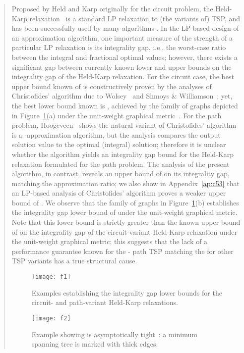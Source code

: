 \documentclass[11pt,letterpaper]{article}
\newcommand{\st}{\mbox{-} }
\begin{document}
\begin{quote}
Proposed by Held and Karp \cite{HK} originally for the circuit problem, the Held-Karp relaxation~\cite{HK} is a standard LP relaxation to (the variants of) TSP, and has been successfully used by many algorithms \cite{BGSW, G:pc, AGMOS, AKS, OSS, MS, M}. In the LP-based design of an approximation algorithm, one important measure of the strength of a particular LP relaxation is its integrality gap, i.e., the worst-case ratio between the integral and fractional optimal values; however, there exists a significant gap between currently known lower and upper bounds on the integrality gap of the Held-Karp relaxation. For the circuit case, the best upper bound known of  is constructively proven by the analyses of Christofides' algorithm due to Wolsey~\cite{W} and Shmoys \& Williamson~\cite{SW}; yet, the best lower bound known is , achieved by the family of graphs depicted in Figure~\ref{f:ig}(a) under the unit-weight graphical metric~\cite{G:ineq}. For the path problem, Hoogeveen~\cite{H} shows the natural variant of Christofides' algorithm is a -approximation algorithm, but the analysis compares the output solution value to the optimal (integral) solution; therefore it is unclear whether the algorithm yields an integrality gap bound for the Held-Karp relaxation formulated for the path problem. The analysis of the present algorithm, in contrast, reveals an upper bound of  on its integrality gap, matching the approximation ratio; we also show in Appendix~\ref{ap:c53} that an LP-based analysis of Christofides' algorithm proves a weaker upper bound of . We observe that the family of graphs in Figure~\mbox{\ref{f:ig}(b)} establishes the integrality gap lower bound of  under the unit-weight graphical metric. Note that this lower bound is strictly greater than the known upper bound of  on the integrality gap of the circuit-variant Held-Karp relaxation under the unit-weight graphical metric; this suggests that the lack of a performance guarantee known for the \st path TSP matching the  for other TSP variants has a true structural cause.

\begin{figure}
\center
\texttt{[image: f1]}
\caption{Examples establishing the integrality gap lower bounds for the circuit- and path-variant Held-Karp relaxations.}
\label{f:ig}
\end{figure}
\begin{figure}
\center
\texttt{[image: f2]}
\caption{Example showing  is asymptotically tight~\cite{H}: a minimum spanning tree is marked with thick edges.}
\label{f:53ex}
\end{figure}


\end{quote}
\end{document}

